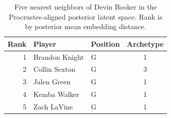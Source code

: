 \begin{table}[htbp]
  \centering\small
  \begin{tabular}{rllc}
    \toprule
    Rank & Player & Position & Archetype \\
    \midrule
    1 & Brandon Knight & G & 1 \\
    2 & Collin Sexton & G & 3 \\
    3 & Jalen Green & G & 1 \\
    4 & Kemba Walker & G & 1 \\
    5 & Zach LaVine & G & 1 \\
    \bottomrule
  \end{tabular}
  \caption{Five nearest neighbors of Devin Booker in the Procrustes-aligned posterior latent space. Rank is by posterior mean embedding distance.}
  \label{tab:Devin_Booker_neighbors}
\end{table}

